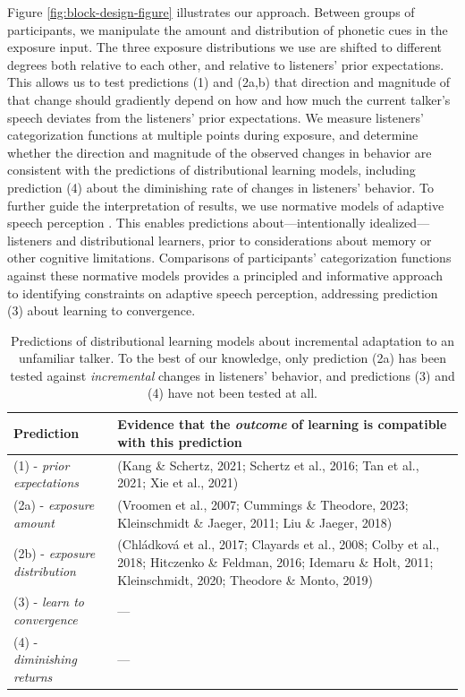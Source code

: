 \documentclass[
  11pt,
  man,mask,floatsintext]{apa6}
\begin{document}
Figure \ref{fig:block-design-figure} illustrates our approach. Between groups of participants, we manipulate the amount and distribution of phonetic cues in the exposure input. The three exposure distributions we use are shifted to different degrees both relative to each other, and relative to listeners' prior expectations. This allows us to test predictions (1) and (2a,b) that direction and magnitude of that change should gradiently depend on how and how much the current talker's speech deviates from the listeners' prior expectations. We measure listeners' categorization functions at multiple points during exposure, and determine whether the direction and magnitude of the observed changes in behavior are consistent with the predictions of distributional learning models, including prediction (4) about the diminishing rate of changes in listeners' behavior. To further guide the interpretation of results, we use normative models of adaptive speech perception \autocites[ideal observers and adaptors,][]{feldman2009,kleinschmidt-jaeger2015,massaro1989,xie2023}. This enables predictions about---intentionally idealized---listeners and distributional learners, prior to considerations about memory or other cognitive limitations. Comparisons of participants' categorization functions against these normative models provides a principled and informative approach to identifying constraints on adaptive speech perception, addressing prediction (3) about learning to convergence.

\begin{table}[!ht]
\begin{small}
\begin{tabular}{p{}p{}}
\hline
Prediction & Evidence that the {\em outcome} of learning is compatible with this prediction \\
\hline
(1) - {\em prior expectations} & (Kang \& Schertz, 2021; Schertz et al., 2016; Tan et al., 2021; Xie et al., 2021) \\

(2a) - {\em exposure amount}  & (Vroomen et al., 2007; Cummings \& Theodore, 2023; Kleinschmidt \& Jaeger, 2011; Liu \& Jaeger, 2018) \\

(2b) - {\em exposure distribution} & (Chl\'adkov\'a et al., 2017; Clayards et al., 2008; Colby et al., 2018; Hitczenko \& Feldman, 2016; Idemaru \& Holt, 2011; Kleinschmidt, 2020; Theodore \& Monto, 2019) \\

(3) - {\em learn to convergence}  & --- \\

(4) - {\em diminishing returns} & --- \\

\hline
\end{tabular}
\caption{Predictions of distributional learning models about incremental adaptation to an unfamiliar talker. To the best of our knowledge, only prediction (2a) has been tested against {\em incremental} changes in listeners' behavior, and predictions (3) and (4) have not been tested at all.}
\label{tab:predictions}
\end{small}
\end{table}
\end{document}
